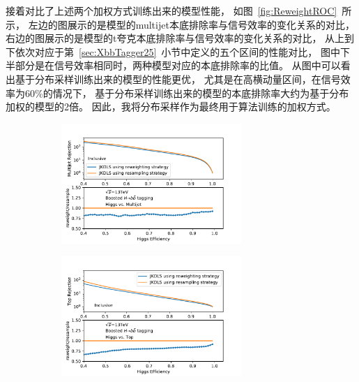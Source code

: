 接着对比了上述两个加权方式训练出来的模型性能，
如图~\ref{fig:ReweightROC}~所示，
左边的图展示的是模型的multijet本底排除率与信号效率的变化关系的对比，
右边的图展示的是模型的t夸克本底排除率与信号效率的变化关系的对比，
从上到下依次对应于第~\ref{sec:XbbTagger25}~小节中定义的五个区间的性能对比，
图中下半部分是在信号效率相同时，两种模型对应的本底排除率的比值。
从图中可以看出基于分布采样训练出来的模型的性能更优，
尤其是在高横动量区间，在信号效率为60\%的情况下，
基于分布采样训练出来的模型的本底排除率大约为基于分布加权的模型的2倍。
因此，我将分布采样作为最终用于算法训练的加权方式。

\begin{figure}[htbp]
  \begin{subfigure}{.5\textwidth}
  \centering
   \includegraphics[width=0.75\textwidth]{figuresXbb/Reweight/QCDIN.pdf}
   \caption{}
   \label{fig:}
  \end{subfigure}
  \begin{subfigure}{.5\textwidth}
  \centering
   \includegraphics[width=0.75\textwidth]{figuresXbb/Reweight/TOPIN.pdf}
   \caption{}
   \label{fig:}
  \end{subfigure}
\newline 
   \begin{subfigure}{.5\textwidth}

\end{subfigure}
\end{figure}
